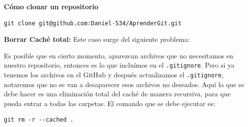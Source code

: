 \documentclass[a4paper]{article}
\begin{document}
\textbf{Cómo clonar un repositorio}

\begin{verbatim}
git clone git@github.com:Daniel-534/AprenderGit.git
\end{verbatim}

\textbf{Borrar Caché total:} Este caso surge del siguiente problema:

Es posible que en cierto momento, aparezcan archivos que no necesitamos en nuestro repositorio, entonces es lo que incluímos en el \texttt{.gitignore}. Pero si ya tenemos los archivos en el GitHub y después actualizamos el \texttt{.gitignore}, notaremos que no se van a desaparecer esos archivos no deseados. Aquí lo que se debe hacer es una eliminación total del caché de manera recursiva, para que pueda entrar a todas las carpetas. El comando que se debe ejecutar es:

\begin{verbatim}
git rm -r --cached .
\end{verbatim}
\end{document}
